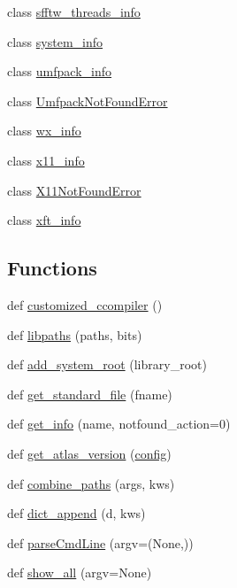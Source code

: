 \begin{DoxyCompactItemize}
class \hyperlink{classnumpy_1_1distutils_1_1system__info_1_1sfftw__threads__info}{sfftw\+\_\+threads\+\_\+info}
\item 
class \hyperlink{classnumpy_1_1distutils_1_1system__info_1_1system__info}{system\+\_\+info}
\item 
class \hyperlink{classnumpy_1_1distutils_1_1system__info_1_1umfpack__info}{umfpack\+\_\+info}
\item 
class \hyperlink{classnumpy_1_1distutils_1_1system__info_1_1UmfpackNotFoundError}{Umfpack\+Not\+Found\+Error}
\item 
class \hyperlink{classnumpy_1_1distutils_1_1system__info_1_1wx__info}{wx\+\_\+info}
\item 
class \hyperlink{classnumpy_1_1distutils_1_1system__info_1_1x11__info}{x11\+\_\+info}
\item 
class \hyperlink{classnumpy_1_1distutils_1_1system__info_1_1X11NotFoundError}{X11\+Not\+Found\+Error}
\item 
class \hyperlink{classnumpy_1_1distutils_1_1system__info_1_1xft__info}{xft\+\_\+info}
\end{DoxyCompactItemize}
\subsection*{Functions}
\begin{DoxyCompactItemize}
\item 
def \hyperlink{namespacenumpy_1_1distutils_1_1system__info_af667f8389de9ee6d857f0785516feaf8}{customized\+\_\+ccompiler} ()
\item 
def \hyperlink{namespacenumpy_1_1distutils_1_1system__info_aa4e9bba0afb772596401b292857b467d}{libpaths} (paths, bits)
\item 
def \hyperlink{namespacenumpy_1_1distutils_1_1system__info_a21bc27719b5a39735f6179e06aeaedf5}{add\+\_\+system\+\_\+root} (library\+\_\+root)
\item 
def \hyperlink{namespacenumpy_1_1distutils_1_1system__info_a3f62ecee14b262e1140931a4b907e927}{get\+\_\+standard\+\_\+file} (fname)
\item 
def \hyperlink{namespacenumpy_1_1distutils_1_1system__info_a690df19e9c1fce9a0658a9a1629e6cb6}{get\+\_\+info} (name, notfound\+\_\+action=0)
\item 
def \hyperlink{namespacenumpy_1_1distutils_1_1system__info_a568f3f79b7e93de852c5265680be2fac}{get\+\_\+atlas\+\_\+version} (\hyperlink{classnumpy_1_1distutils_1_1command_1_1config_1_1config}{config})
\item 
def \hyperlink{namespacenumpy_1_1distutils_1_1system__info_a9da1646261e70ab361b7bbe3e64584c6}{combine\+\_\+paths} (args, kws)
\item 
def \hyperlink{namespacenumpy_1_1distutils_1_1system__info_ab95be5e3385c6c6ddfaedf208de2e5db}{dict\+\_\+append} (d, kws)
\item 
def \hyperlink{namespacenumpy_1_1distutils_1_1system__info_ab55940fc54600e522e68f0563b132782}{parse\+Cmd\+Line} (argv=(None,))
\item 
def \hyperlink{namespacenumpy_1_1distutils_1_1system__info_a55f5263f3882b0c59bf4c7fbc823e603}{show\+\_\+all} (argv=None)
\end{DoxyCompactItemize}
